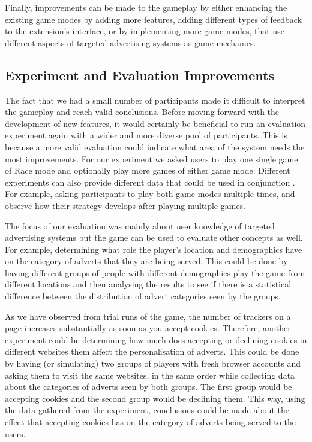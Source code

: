 \documentclass{l4proj}
\begin{document}
Finally, improvements can be made to the gameplay by either enhancing the existing game modes by adding more features, adding different types of feedback to the extension's interface, or by implementing more game modes, that use different aspects of targeted advertising systems as game mechanics.

\subsection{Experiment and Evaluation Improvements}
The fact that we had a small number of participants made it difficult to interpret the gameplay and reach valid conclusions. Before moving forward with the development of new features, it would certainly be beneficial to run an evaluation experiment again with a wider and more diverse pool of participants. This is because a more valid evaluation could indicate what area of the system needs the most improvements. For our experiment we asked users to play one single game of Race mode and optionally play more games of either game mode. Different experiments can also provide different data that could be used in conjunction . For example, asking participants to play both game modes multiple times, and observe how their strategy develops after playing multiple games.

The focus of our evaluation was mainly about user knowledge of targeted advertising systems but the game can be used to evaluate other concepts as well. For example, determining what role the player's location and demographics have on the category of adverts that they are being served. This could be done by having different groups of people with different demographics play the game from different locations and then analysing the results to see if there is a statistical difference between the distribution of advert categories seen by the groups. 

As we have observed from trial runs of the game, the number of trackers on a page increases substantially as soon as you accept cookies. Therefore, another experiment could be determining how much does accepting or declining cookies in different websites them affect the personalisation of adverts. This could be done by having (or simulating) two groups of players with fresh browser accounts and asking them to visit the same websites, in the same order while collecting data about the categories of adverts seen by both groups. The first group would be accepting cookies and the second group would be declining them. This way, using the data gathered from the experiment, conclusions could be made about the effect that accepting cookies has on the category of adverts being served to the users. 
\end{document}
